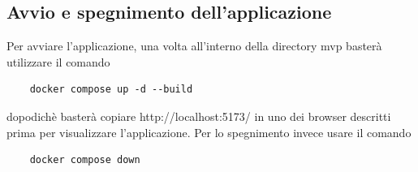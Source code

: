 \subsection{Avvio e spegnimento dell'applicazione}
Per avviare l'applicazione, una volta all'interno della directory mvp basterà utilizzare il comando
\begin{verbatim}
    docker compose up -d --build
\end{verbatim}
dopodichè basterà copiare http://localhost:5173/ in uno dei browser descritti prima per visualizzare l'applicazione.
Per lo spegnimento invece usare il comando
\begin{verbatim}
    docker compose down
\end{verbatim}